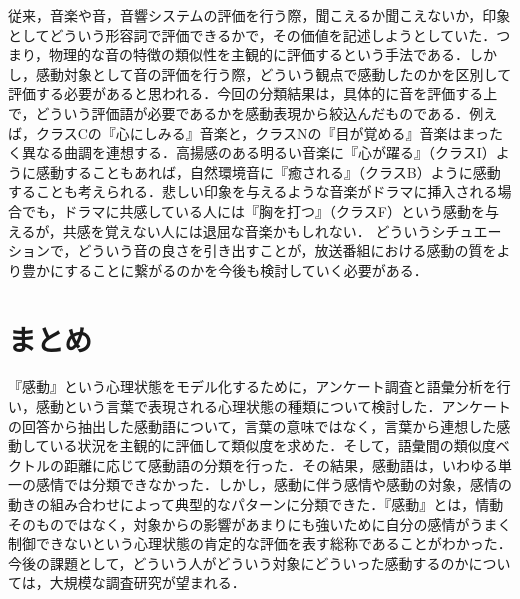 \documentclass[japanese]{jnlp_1.3c}
\begin{document}
従来，音楽や音，音響システムの評価を行う際，聞こえるか聞こえないか，印象としてどういう形容詞で評価できるかで，その価値を記述しようとしていた．つまり，物理的な音の特徴の類似性を主観的に評価するという手法である．しかし，感動対象として音の評価を行う際，どういう観点で感動したのかを区別して評価する必要があると思われる．今回の分類結果は，具体的に音を評価する上で，どういう評価語が必要であるかを感動表現から絞込んだものである．例えば，クラスCの『心にしみる』音楽と，クラスNの『目が覚める』音楽はまったく異なる曲調を連想する．高揚感のある明るい音楽に『心が躍る』（クラスI）ように感動することもあれば，自然環境音に『癒される』（クラスB）ように感動することも考えられる．悲しい印象を与えるような音楽がドラマに挿入される場合でも，ドラマに共感している人には『胸を打つ』（クラスF）という感動を与えるが，共感を覚えない人には退屈な音楽かもしれない． どういうシチュエーションで，どういう音の良さを引き出すことが，放送番組における感動の質をより豊かにすることに繋がるのかを今後も検討していく必要がある．



\section{まとめ}

『感動』という心理状態をモデル化するために，アンケート調査と語彙分析を行い，感動という言葉で表現される心理状態の種類について検討した．アンケートの回答から抽出した感動語について，言葉の意味ではなく，言葉から連想した感動している状況を主観的に評価して類似度を求めた．そして，語彙間の類似度ベクトルの距離に応じて感動語の分類を行った．その結果，感動語は，いわゆる単一の感情では分類できなかった．しかし，感動に伴う感情や感動の対象，感情の動きの組み合わせによって典型的なパターンに分類できた．『感動』とは，情動そのものではなく，対象からの影響があまりにも強いために自分の感情がうまく制御できないという心理状態の肯定的な評価を表す総称であることがわかった．今後の課題として，どういう人がどういう対象にどういった感動するのかについては，大規模な調査研究が望まれる．
\end{document}
